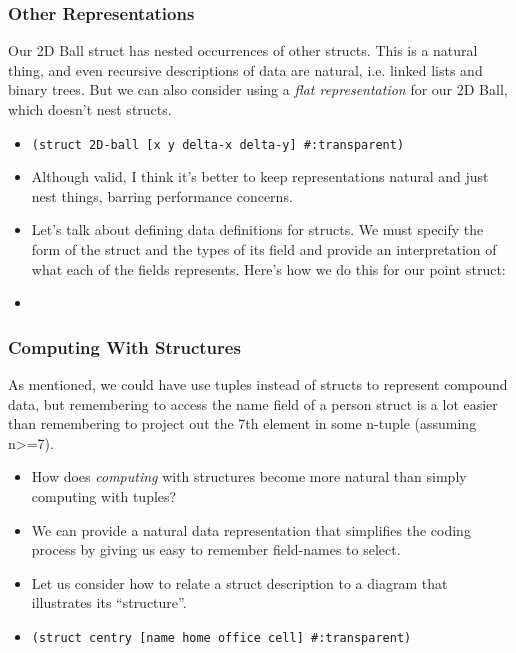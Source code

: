 \documentclass{beamer}
\begin{document}
\begin{frame}
  \frametitle{Other Representations}
  Our 2D Ball struct has nested occurrences of other structs. This is a natural thing, and even recursive descriptions of data are natural, i.e.
  linked lists and binary trees. But we can also consider using a \emph{flat representation} for our 2D Ball, which doesn't nest structs.
  \begin{itemize}
  \item<2-> \texttt{(struct 2D-ball [x y delta-x delta-y] \#:transparent)}
  \item<3-> Although valid, I think it's better to keep representations natural and just nest things, barring performance concerns.
  \item<4-> Let's talk about defining data definitions for structs. We must specify the form of the struct and the types of its field and provide an interpretation of what
    each of the fields represents. Here's how we do this for our point struct:
  \item<5->\pointDefinition
  \end{itemize}
\end{frame}


\begin{frame}
  \frametitle{Computing With Structures}
  As mentioned, we could have use tuples instead of structs to represent
  compound data, but remembering to access the name field of a person
  struct is a lot easier than remembering to project out the 7th element
  in some n-tuple (assuming n>=7).
  \begin{itemize}
  \item<2-> How does \emph{computing} with structures become more natural than simply computing with tuples?  
  \item<3-> We can provide  a natural data representation that simplifies the coding process by giving us easy to remember
    field-names to select.
  \item<4-> Let us consider how to relate a struct description
    to a diagram that illustrates its ``structure''.
  \item<5-> \texttt{(struct centry [name home office cell] \#:transparent)}
  \end{itemize}
\end{frame}
\end{document}
